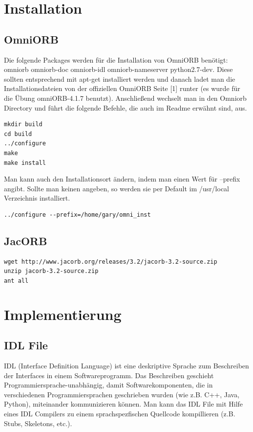 \documentclass[11pt]{article}
\begin{document}
\section{Installation}

\subsection{OmniORB}

Die folgende Packages werden für die Installation von OmniORB benötigt: omniorb omniorb-doc omniorb-idl omniorb-nameserver python2.7-dev. Diese sollten entsprechend mit apt-get installiert werden und danach ladet man die Installationsdateien von der offiziellen OmniORB Seite [1] runter (es wurde für die Übung omniORB-4.1.7 benutzt). Anschließend wechselt man in den Omniorb Directory und führt die folgende Befehle, die auch im Readme erwähnt sind, aus.

\begin{lstlisting}
mkdir build
cd build
../configure
make
make install
\end{lstlisting}

Man kann auch den Installationsort ändern, indem man einen Wert für --prefix angibt. Sollte man keinen angeben, so werden sie per Default im /usr/local Verzeichnis installiert.

\begin{lstlisting}
../configure --prefix=/home/gary/omni_inst
\end{lstlisting}

\subsection{JacORB}

\begin{lstlisting}
wget http://www.jacorb.org/releases/3.2/jacorb-3.2-source.zip
unzip jacorb-3.2-source.zip
ant all
\end{lstlisting}

\section{Implementierung}

\subsection{IDL File}

IDL (Interface Definition Language) ist eine deskriptive Sprache zum Beschreiben der Interfaces in einem Softwareprogramm. Das Beschreiben geschieht Programmiersprache-unabhängig, damit Softwarekomponenten, die in verschiedenen Programmiersprachen geschrieben wurden (wie z.B. C++, Java, Python), miteinander kommunizieren können. Man kann das IDL File mit Hilfe eines IDL Compilers zu einem sprachspezfischen Quellcode kompillieren (z.B. Stubs, Skeletons, etc.). 
\end{document}

